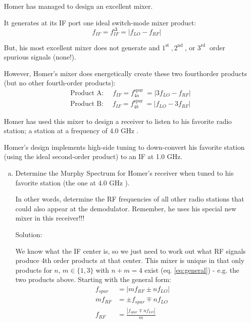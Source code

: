\newpage
\begin{homeworkProblem}

    Homer has managed to design an excellent mixer.

    It generates at its IF port one ideal switch-mode mixer product:
    $$
    f_{I F}=f_{I F}^{\Delta}=\left|f_{L O}-f_{R F}\right|
    $$

    But, his most excellent mixer does not generate and $1^{\text {st }}, 2^{\text {nd }}$, or $3^{\text {rd }}$ order spurious signals (none!).

    However, Homer's mixer does energetically create these two fourthorder products (but no other fourth-order products):
    $$
    \begin{aligned}
& \text { Product A: } \quad f_{I F}=f_{4 a}^{\text {spur }}=\left|3 f_{L O}-f_{R F}\right| \\
& \text { Product B: } \quad f_{I F}=f_{4 b}^{\text {spur }}=\left|f_{L O}-3 f_{R F}\right|
    \end{aligned}
    $$

    Homer has used this mixer to design a receiver to listen to his favorite radio station; a station at a frequency of 4.0 GHz .

    Homer's design implements high-side tuning to down-convert his favorite station (using the ideal second-order product) to an IF at 1.0 GHz.

    \begin{enumerate}[a)]
        \item Determine the Murphy Spectrum for Homer's receiver when tuned to his favorite station (the one at 4.0 GHz ).
 
            In other words, determine the RF frequencies of all other radio stations that could also appear at the demodulator. Remember, he uses his special new mixer in this receiver!!!

            \begin{callout}{Solution:}

                We know what the IF center is, so we just need to work out what RF signals produce 4th order products at that center. This mixer is unique in that only products for $n,\,m \in \{1, 3\}$ with $n+m=4$ exist (eq. \ref{eq:general}) - e.g. the two products above. Starting with the general form:
                \begin{align*}
                    f_{spur} &= | mf_{RF} \pm nf_{LO} | \\
                    mf_{RF} &=  \pm f_{spur} \mp nf_{LO} \\
                    f_{RF} &=  \frac{|f_{spur} \mp nf_{LO}|}{m}
                \end{align*}


\end{callout}
\end{enumerate}
\end{homeworkProblem}
